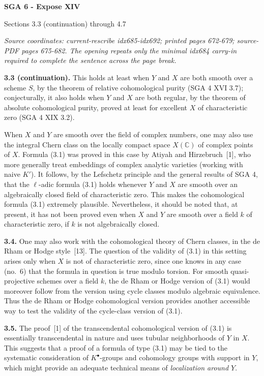 \documentclass[11pt]{article}
\newcommand{\C}{\mathbb C}
\begin{document}
\begin{center}
{\Large\bfseries SGA 6 - Expose XIV}\par
\medskip
{\large Sections 3.3 (continuation) through 4.7}
\end{center}

\noindent\textit{Source coordinates: current-rescribe idx685-idx692; printed
pages 672-679; source-PDF pages 675-682. The opening repeats only the minimal
idx684 carry-in required to complete the sentence across the page break.}

\bigskip

\noindent\textbf{3.3 (continuation).}
This holds at least when $Y$ and $X$ are both smooth over a scheme $S$, by the
theorem of relative cohomological purity (SGA 4 XVI 3.7); conjecturally, it
also holds when $Y$ and $X$ are both regular, by the theorem of absolute
cohomological purity, proved at least for excellent $X$ of characteristic
zero (SGA 4 XIX 3.2).

When $X$ and $Y$ are smooth over the field of complex numbers, one may also
use the integral Chern class on the locally compact space $X(\C)$ of complex
points of $X$. Formula (3.1) was proved in this case by Atiyah and
Hirzebruch~[1], who more generally treat embeddings of complex analytic
varieties (working with naive $K'$). It follows, by the Lefschetz principle
and the general results of SGA 4, that the $\ell$-adic formula (3.1) holds
whenever $Y$ and $X$ are smooth over an algebraically closed field of
characteristic zero. This makes the cohomological formula (3.1) extremely
plausible. Nevertheless, it should be noted that, at present, it has not been
proved even when $X$ and $Y$ are smooth over a field $k$ of characteristic
zero, if $k$ is not algebraically closed.

\noindent\textbf{3.4.}
One may also work with the cohomological theory of Chern classes, in the de
Rham or Hodge style~[13]. The question of the validity of (3.1) in this
setting arises only when $X$ is not of characteristic zero, since one knows
in any case (no.~6) that the formula in question is true modulo torsion. For
smooth quasi-projective schemes over a field $k$, the de Rham or Hodge
version of (3.1) would moreover follow from the version using cycle classes
modulo algebraic equivalence. Thus the de Rham or Hodge cohomological version
provides another accessible way to test the validity of the cycle-class
version of (3.1).

\noindent\textbf{3.5.}
The proof~[1] of the transcendental cohomological version of (3.1) is
essentially transcendental in nature and uses tubular neighborhoods of $Y$
in $X$. This suggests that a proof of a formula of type (3.1) may be tied to
the systematic consideration of $K^\bullet$-groups and cohomology groups with
support in $Y$, which might provide an adequate technical means of
\emph{localization around $Y$}.
\end{document}
